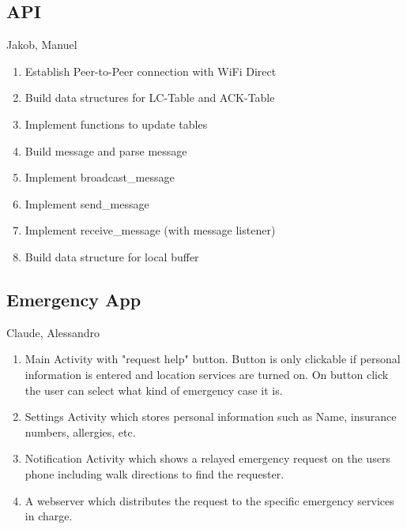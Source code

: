 	
		\subsection{API}
			Jakob, Manuel

\begin{enumerate}
\item Establish Peer-to-Peer connection with WiFi Direct
\item Build data structures for LC-Table and ACK-Table
\item Implement functions to update tables
\item Build message and parse message
\item Implement broadcast\_message
\item Implement send\_message
\item Implement receive\_message (with message listener)
\item Build data structure for local buffer
\end{enumerate}


		
		\subsection{Emergency App}
			Claude, Alessandro
			\begin{enumerate}
				\item Main Activity with "request help" button. Button is only clickable if personal information is entered and location services are turned on. On button click the user can select what kind of emergency case it is.
				\item Settings Activity which stores personal information such as Name, insurance numbers, allergies, etc.
				\item Notification Activity which shows a relayed emergency request on the users phone including walk directions to find the requester.
				\item A webserver which distributes the request to the specific emergency services in charge.
			\end{enumerate}
		
